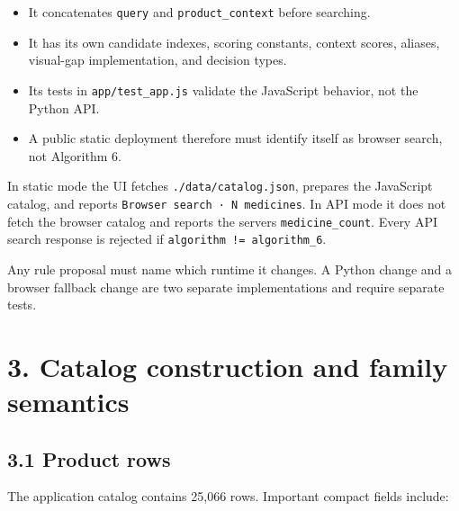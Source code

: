 \begin{itemize}
\tightlist
\item
  It concatenates \texttt{query} and \texttt{product\_\allowbreak{}context} before searching.
\item
  It has its own candidate indexes, scoring constants, context scores, aliases, visual-gap implementation, and decision types.
\item
  Its tests in \texttt{app/test\_\allowbreak{}app.js} validate the JavaScript behavior, not the Python API.
\item
  A public static deployment therefore must identify itself as browser search, not Algorithm 6.
\end{itemize}

In static mode the UI fetches \texttt{./data/catalog.json}, prepares the JavaScript catalog, and reports \texttt{Browser\ search\ ·\ N\ medicines}. In API mode it does not fetch the browser catalog and reports the server\textquotesingle s \texttt{medicine\_\allowbreak{}count}. Every API search response is rejected if \texttt{algorithm\ !=\ algorithm\_\allowbreak{}6}.

Any rule proposal must name which runtime it changes. A Python change and a browser fallback change are two separate implementations and require separate tests.

\section{3. Catalog construction and family semantics}\label{3-catalog-construction-and-family-semantics}

\subsection{3.1 Product rows}\label{31-product-rows}

The application catalog contains 25,066 rows. Important compact fields include:

